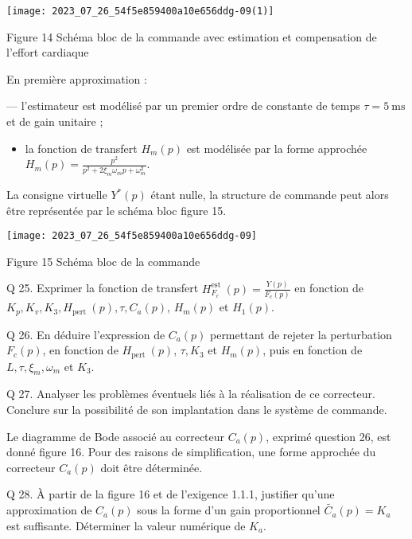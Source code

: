 \begin{center}
\texttt{[image: 2023\_07\_26\_54f5e859400a10e656ddg-09(1)]}
\end{center}

Figure 14 Schéma bloc de la commande avec estimation et compensation de l'effort cardiaque

En première approximation :

— l'estimateur est modélisé par un premier ordre de constante de temps $\tau=5 \mathrm{~ms}$ et de gain unitaire ;

\begin{itemize}
  \item la fonction de transfert $H_{m}(p)$ est modélisée par la forme approchée $H_{m}(p)=\frac{p^{2}}{p^{2}+2 \xi_{m} \omega_{m} p+\omega_{m}^{2}}$.
\end{itemize}

La consigne virtuelle $Y^{*}(p)$ étant nulle, la structure de commande peut alors être représentée par le schéma bloc figure 15.

\begin{center}
\texttt{[image: 2023\_07\_26\_54f5e859400a10e656ddg-09]}
\end{center}

Figure 15 Schéma bloc de la commande

Q 25. Exprimer la fonction de transfert $H_{F_{c}}^{\text {est }}(p)=\frac{Y(p)}{F_{c}(p)}$ en fonction de $K_{p}, K_{v}, K_{3}, H_{\text {pert }}(p), \tau, C_{a}(p)$, $H_{m}(p)$ et $H_{1}(p)$.

Q 26. En déduire l'expression de $C_{a}(p)$ permettant de rejeter la perturbation $F_{c}(p)$, en fonction de $H_{\text {pert }}(p)$, $\tau, K_{3}$ et $H_{m}(p)$, puis en fonction de $L, \tau, \xi_{m}, \omega_{m}$ et $K_{3}$.

Q 27. Analyser les problèmes éventuels liés à la réalisation de ce correcteur. Conclure sur la possibilité de son implantation dans le système de commande.

Le diagramme de Bode associé au correcteur $C_{a}(p)$, exprimé question 26, est donné figure 16. Pour des raisons de simplification, une forme approchée du correcteur $C_{a}(p)$ doit être déterminée.

Q 28. À partir de la figure 16 et de l'exigence 1.1.1, justifier qu'une approximation de $C_{a}(p)$ sous la forme d'un gain proportionnel $\widetilde{C_{a}}(p)=K_{a}$ est suffisante. Déterminer la valeur numérique de $K_{a}$.

